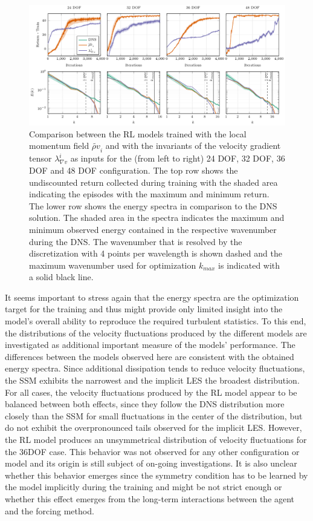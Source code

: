 \begin{figure}
  \centering
  \includegraphics[width=\textwidth]{tikz_double_column/draft-figure4.pdf}
  \caption{Comparison between the RL models trained with the local momentum field $\widetilde{\rho v}_i$ and with the invariants of the velocity gradient tensor $\lambda_{\nabla v}^i$ as inputs for the (from left to right) 24 DOF, 32 DOF, 36 DOF and 48 DOF configuration. The top row shows the undiscounted return collected during training with the shaded area indicating the episodes with the maximum and minimum return. The lower row shows the energy spectra in comparison to the DNS solution. The shaded area in the spectra indicates the maximum and minimum observed energy contained in the respective wavenumber during the DNS. The wavenumber that is resolved by the discretization with 4 points per wavelength is shown dashed and the maximum wavenumber used for optimization $k_{max}$ is indicated with a solid black line.}
  \label{fig:invariants}
\end{figure}

It seems important to stress again that the energy spectra are the optimization target for the training and thus might provide only limited insight into the model's overall ability to reproduce the required turbulent statistics.
To this end, the distributions of the velocity fluctuations produced by the different models are investigated as additional important measure of the models' performance.
The differences between the models observed here are consistent with the obtained energy spectra.
Since additional dissipation tends to reduce velocity fluctuations, the SSM exhibits the narrowest and the implicit LES the broadest distribution.
For all cases, the velocity fluctuations produced by the RL model appear to be balanced between both effects, since they follow the DNS distribution more closely than the SSM for small fluctuations in the center of the distribution, but do not exhibit the overpronounced tails observed for the implicit LES.
However, the RL model produces an unsymmetrical distribution of velocity fluctuations for the 36DOF case.
This behavior was not observed for any other configuration or model and its origin is still subject of on-going investigations.
It is also unclear whether this behavior emerges since the symmetry condition has to be learned by the model implicitly during the training and might be not strict enough or whether this effect emerges from the long-term interactions between the agent and the forcing method.

